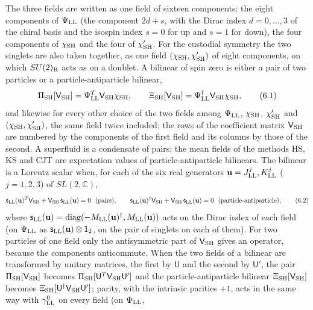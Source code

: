 \documentclass[
  10pt,
]{article}
\begin{document}
The three fields are written as one field of sixteen components: the
eight components of \(\Psi_{\rm LL}\) (the component \(2d+s\), with the
Dirac index \(d=0,\dots,3\) of the chiral basis and the isospin index
\(s=0\) for up and \(s=1\) for down), the four components of
\(\chi_{\rm SH}\) and the four of \(\chi'_{\rm SH}\). For the custodial
symmetry the two singlets are also taken together, as one field
\((\chi_{\rm SH},\chi'_{\rm SH})\) of eight components, on which
\(SU(2)_{\rm R}\) acts as on a doublet. A bilinear of spin zero is
either a pair of two particles or a particle-antiparticle bilinear,
\[\Pi_{\rm SH}[\mathsf V_{\rm SH}]=\Psi^T_{\rm LL}\mathsf V_{\rm SH}\chi_{\rm SH},\qquad
\Xi_{\rm SH}[\mathsf V_{\rm SH}]=\Psi^\dagger_{\rm LL}\mathsf V_{\rm SH}\chi_{\rm SH},\tag{6.1}\]
and likewise for every other choice of the two fields among
\(\Psi_{\rm LL}\), \(\chi_{\rm SH}\), \(\chi'_{\rm SH}\) and
\((\chi_{\rm SH},\chi'_{\rm SH})\), the same field twice included; the
rows of the coefficient matrix \(\mathsf V_{\rm SH}\) are numbered by
the components of the first field and its columns by those of the
second. A superfluid is a condensate of pairs; the mean fields of the
methods HS, KS and CJT are expectation values of particle-antiparticle
bilinears. The bilinear is a Lorentz scalar when, for each of the six
real generators \(\mathbf u=J^j_{\rm LL},K^j_{\rm LL}\) (\(j=1,2,3\)) of
\(SL(2,\mathbb C)\),
\[\mathsf s_{\rm LL}(\mathbf u)^T\mathsf V_{\rm SH}+\mathsf V_{\rm SH}\,\mathsf s_{\rm LL}(\mathbf u)=0\ \ \text{(pairs)},\qquad
\mathsf s_{\rm LL}(\mathbf u)^\dagger\mathsf V_{\rm SH}+\mathsf V_{\rm SH}\,\mathsf s_{\rm LL}(\mathbf u)=0\ \ \text{(particle-antiparticle)},\tag{6.2}\]
where
\(\mathsf s_{\rm LL}(\mathbf u)=\mathrm{diag}(-M_{\rm LL}(\mathbf u)^\dagger,M_{\rm LL}(\mathbf u))\)
acts on the Dirac index of each field (on \(\Psi_{\rm LL}\) as
\(\mathsf s_{\rm LL}(\mathbf u)\otimes\mathsf 1_2\), on the pair of
singlets on each of them). For two particles of one field only the
antisymmetric part of \(\mathsf V_{\rm SH}\) gives an operator, because
the components anticommute. When the two fields of a bilinear are
transformed by unitary matrices, the first by \(\mathsf U\) and the
second by \(\mathsf U'\), the pair \(\Pi_{\rm SH}[\mathsf V_{\rm SH}]\)
becomes \(\Pi_{\rm SH}[\mathsf U^T\mathsf V_{\rm SH}\mathsf U']\) and
the particle-antiparticle bilinear \(\Xi_{\rm SH}[\mathsf V_{\rm SH}]\)
becomes \(\Xi_{\rm SH}[\mathsf U^\dagger\mathsf V_{\rm SH}\mathsf U']\);
parity, with the intrinsic parities \(+1\), acts in the same way with
\(\gamma^0_{\rm LL}\) on every field (on \(\Psi_{\rm LL}\),
\end{document}
